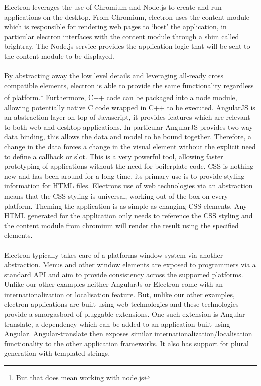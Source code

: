 %
  Electron leverages the use of Chromium and Node.js to create and run applications on the desktop. From Chromium, electron uses the content module which is responsible for rendering web pages to `host' the application, in particular electron interfaces with the content module through a shim called brightray. The Node.js service provides the application logic that will be sent to the content module to be displayed.\\\\
  By abstracting away the low level details and leveraging all-ready cross compatible elements, electron is able to provide the same functionality regardless of platform.\footnote{But that does mean working with node.js} Furthermore, C++ code can be packaged into a node module, allowing potentially native C code wrapped in C++ to be executed.
  AngularJS is an abstraction layer on top of Javascript, it provides features which are relevant to both web and desktop applications. In particular AngularJS provides two way data binding, this allows the data and model to be bound together. Therefore, a change in the data forces a change in the visual element without the explicit need to define a callback or slot. This is a very powerful tool, allowing faster prototyping of applications without the need for boilerplate code.
  CSS is nothing new and has been around for a long time, its primary use is to provide styling information for HTML files. Electrons use of web technologies via an abstraction means that the CSS styling is universal, working out of the box on every platform. Theming the application is as simple as changing CSS elements. Any HTML generated for the application only needs to reference the CSS styling and the content module from chromium will render the result using the specified elements.\\\\
  Electron typically takes care of a platforms window system via another abstraction. Menus and other window elements are exposed to programmers via a standard API and aim to provide consistency across the supported platforms.
  Unlike our other examples neither AngularJs or Electron come with an internationalization or localisation feature. But, unlike our other examples, electron applications are built using web technologies and these technologies provide a smorgasbord of pluggable extensions. One such extension is Angular-translate, a dependency which can be added to an application built using Angular. Angular-translate then exposes similar internationalization/localisation functionality to the other application frameworks. It also has support for plural generation with templated strings.

